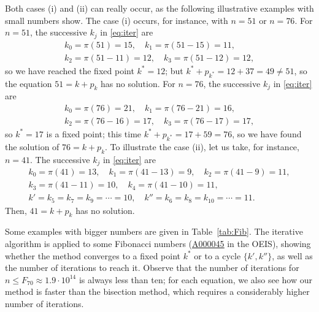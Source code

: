 \documentclass[12pt,reqno]{article}
\newcommand{\seqnum}[1]{\href{https://oeis.org/#1}{\rm \underline{#1}}}
\begin{document}
Both cases (i) and (ii) can really occur, as the following illustrative examples with small numbers show. The case (i) occurs, for instance, with $n=51$ or $n=76$. 
For $n=51$, the successive $k_j$ in \eqref{eq:iter} are
\begin{gather*}
  k_0 = \pi(51) = 15,
  \quad
  k_1 = \pi(51-15) = 11,
  \\
  k_2 = \pi(51-11) = 12,
  \quad
  k_3 = \pi(51-12) = 12,
\end{gather*}
so we have reached the fixed point $k^{*} = 12$; but $k^{*} + p_{k^{*}} = 12 + 37 = 49 \ne 51$,
so the equation $51 = k + p_{k}$ has no solution.
For $n=76$, the successive $k_j$ in \eqref{eq:iter} are
\begin{gather*}
  k_0 = \pi(76) = 21,
  \quad
  k_1 = \pi(76-21) = 16,
  \\
  k_2 = \pi(76-16) = 17,
  \quad
  k_3 = \pi(76-17) = 17,
\end{gather*}
so $k^{*} = 17$ is a fixed point; this time $k^{*} + p_{k^{*}} = 17+59 = 76$,
so we have found the solution of $76 = k + p_{k}$.
To illustrate the case (ii), let us take, for instance, $n=41$.
The successive $k_j$ in \eqref{eq:iter} are
\begin{gather*}
  k_0 = \pi(41) = 13,
  \quad
  k_1 = \pi(41-13) = 9,
  \quad
  k_2 = \pi(41-9) = 11,
  \\
  k_3 = \pi(41-11) = 10,
  \quad
  k_4 = \pi(41-10) = 11,
  \\
  k' = k_5 = k_7 = k_9 = \cdots = 10,
  \quad
  k'' = k_6 = k_8 = k_{10} = \cdots = 11.
\end{gather*}
Then, $41 = k + p_{k}$ has no solution.

Some examples with bigger numbers are given in Table~\ref{tab:Fib}.
The iterative algorithm is applied to some Fibonacci numbers (\seqnum{A000045} in the OEIS), showing whether the method converges to a fixed point $k^{*}$ or to a cycle $\{k',k''\}$, as well as the number of iterations to reach it. Observe that the number of iterations for $n \le F_{70} \approx 1.9\cdot 10^{14}$ is always less than ten; for each equation, we also see how our method is faster than the bisection method, which requires a considerably higher number of iterations.
\end{document}
